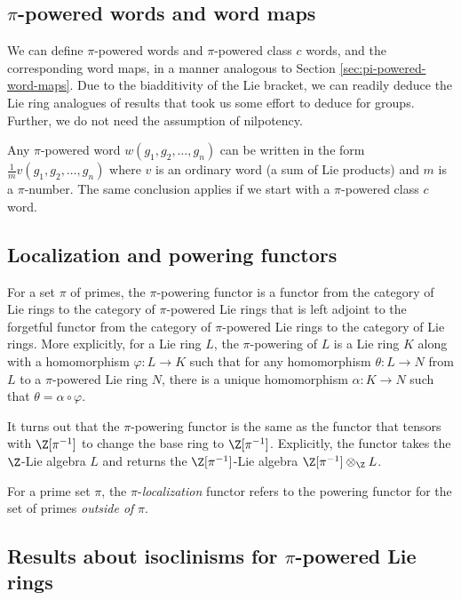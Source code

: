 \documentclass{ucetd}
\begin{document}
\subsection{$\pi$-powered words and word maps}

We can define $\pi$-powered words and $\pi$-powered class $c$ words,
and the corresponding word maps, in a manner analogous to Section
\ref{sec:pi-powered-word-maps}. Due to the biadditivity of the Lie
bracket, we can readily deduce the Lie ring analogues of results that
took us some effort to deduce for groups. Further, we do not need the
assumption of nilpotency.

Any $\pi$-powered word $w(g_1,g_2,\dots,g_n)$ can be written in the
form $\frac{1}{m}v(g_1,g_2,\dots,g_n)$ where $v$ is an ordinary word
(a sum of Lie products) and $m$ is a $\pi$-number. The same conclusion
applies if we start with a $\pi$-powered class $c$ word.

\subsection{Localization and powering functors}\label{sec:localization-and-powering-functors-lie}

For a set $\pi$ of primes, the $\pi$-powering functor is a functor
from the category of Lie rings to the category of $\pi$-powered Lie rings
that is left adjoint to the forgetful functor from the category of
$\pi$-powered Lie rings to the category of Lie rings. More explicitly, for a
Lie ring $L$, the $\pi$-powering of $L$ is a Lie ring $K$ along with a
homomorphism $\varphi:L \to K$ such that for any homomorphism
$\theta:L \to N$ from $L$ to a $\pi$-powered Lie ring $N$, there is a
unique homomorphism $\alpha:K \to N$ such that $\theta = \alpha \circ
\varphi$.

It turns out that the $\pi$-powering functor is the same as the
functor that tensors with $\Z[\pi^{-1}]$ to change the base ring to
$\Z[\pi^{-1}]$. Explicitly, the functor takes the $\Z$-Lie algebra $L$
and returns the $\Z[\pi^{-1}]$-Lie algebra $\Z[\pi^{-1}] \otimes_\Z L$.

For a prime set $\pi$, the $\pi$-{\em localization} functor refers to
the powering functor for the set of primes {\em outside of} $\pi$.

\subsection{Results about isoclinisms for $\pi$-powered Lie rings}\label{sec:pi-powered-isoclinism-results-lie}
\end{document}
